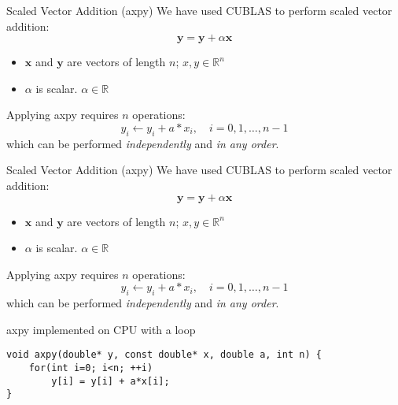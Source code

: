 \documentclass[aspectratio=43]{beamer}
\newcommand{\axpy}{{\ttfamily axpy}\xspace}
\begin{document}
\begin{frame}[fragile]{Scaled Vector Addition (\axpy)}
    We have used CUBLAS to perform scaled vector addition:
        $$\mathbf{y} = \mathbf{y} + \alpha \mathbf{x}$$
        \vspace{-15pt}
    \begin{itemize}
        \item $\mathbf{x}$ and $\mathbf{y}$ are vectors of length $n$; \hfill $x,y \in \mathbb{R}^n$
        \item $\alpha$ is scalar. \hfill $\alpha\in\mathbb{R}$
    \end{itemize}
    Applying \axpy requires $n$ operations:
    $$y_i \leftarrow y_i + a*x_i,\quad i = {0, 1, \dots, n-1}$$
    which can be performed \emph{independently} and \emph{in any order}.

\end{frame}

\begin{frame}[fragile]{Scaled Vector Addition (\axpy)}
    We have used CUBLAS to perform scaled vector addition:
        $$\mathbf{y} = \mathbf{y} + \alpha \mathbf{x}$$
        \vspace{-15pt}
    \begin{itemize}
        \item $\mathbf{x}$ and $\mathbf{y}$ are vectors of length $n$; \hfill $x,y \in \mathbb{R}^n$
        \item $\alpha$ is scalar. \hfill $\alpha\in\mathbb{R}$
    \end{itemize}
    Applying \axpy requires $n$ operations:
    $$y_i \leftarrow y_i + a*x_i,\quad i = {0, 1, \dots, n-1}$$
    which can be performed \emph{independently} and \emph{in any order}.

    \begin{code}{\axpy implemented on CPU with a loop}
        \begin{lstlisting}[style=boxcuda]
void axpy(double* y, const double* x, double a, int n) {
    for(int i=0; i<n; ++i)
        y[i] = y[i] + a*x[i];
}
        \end{lstlisting}
    \end{code}

\end{frame}
\end{document}
